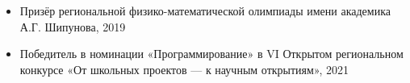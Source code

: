 

\vspace{149,5pt}

\begin{itemize}
\item Призёр региональной физико-математической олимпиады имени академика А.Г. Шипунова, 2019
\item Победитель в номинации «Программирование» в VI Открытом региональном конкурсе «От школьных проектов --- к научным открытиям», 2021
\end{itemize}